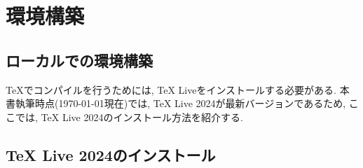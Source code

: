 \section{環境構築}
\subsection{ローカルでの環境構築}
\TeX でコンパイルを行うためには, TeX Liveをインストールする必要がある.
本書執筆時点(\today 現在)では, TeX Live 2024が最新バージョンであるため,
ここでは, TeX Live 2024のインストール方法を紹介する.
\subsection{TeX Live 2024のインストール}
